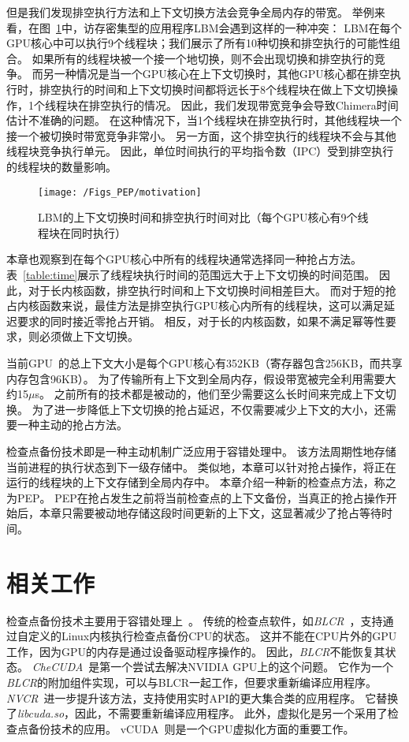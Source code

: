 但是我们发现排空执行方法和上下文切换方法会竞争全局内存的带宽。
举例来看，在图~\ref{fig:motivation}中，访存密集型的应用程序LBM会遇到这样的一种冲突：
LBM在每个GPU核心中可以执行9个线程块；我们展示了所有10种切换和排空执行的可能性组合。
如果所有的线程块被一个接一个地切换，则不会出现切换和排空执行的竞争。
而另一种情况是当一个GPU核心在上下文切换时，其他GPU核心都在排空执行时，排空执行的时间和上下文切换时间都将远长于8个线程块在做上下文切换操作，1个线程块在排空执行的情况。
因此，我们发现带宽竞争会导致Chimera时间估计不准确的问题。
在这种情况下，当1个线程块在排空执行时，其他线程块一个接一个被切换时带宽竞争非常小。
另一方面，这个排空执行的线程块不会与其他线程块竞争执行单元。
因此，单位时间执行的平均指令数（IPC）受到排空执行的线程块的数量影响。


\begin{figure}[htbp] %
  \centering
  \texttt{[image: /Figs\_PEP/motivation]}
  \caption{LBM的上下文切换时间和排空执行时间对比（每个GPU核心有9个线程块在同时执行）}
  \label{fig:motivation}
\end{figure}


本章也观察到在每个GPU核心中所有的线程块通常选择同一种抢占方法。
表~\ref{table:time}展示了线程块执行时间的范围远大于上下文切换的时间范围。
因此，对于长内核函数，排空执行时间和上下文切换时间相差巨大。
而对于短的抢占内核函数来说，最佳方法是排空执行GPU核心内所有的线程块，这可以满足延迟要求的同时接近零抢占开销。
相反，对于长的内核函数，如果不满足幂等性要求，则必须做上下文切换。

当前GPU~的总上下文大小是每个GPU核心有352KB（寄存器包含256KB，而共享内存包含96KB）。
为了传输所有上下文到全局内存，假设带宽被完全利用需要大约15$\mu$s。
之前所有的技术都是被动的，他们至少需要这么长时间来完成上下文切换。
为了进一步降低上下文切换的抢占延迟，不仅需要减少上下文的大小，还需要一种主动的抢占方法。

检查点备份技术即是一种主动机制广泛应用于容错处理中。
该方法周期性地存储当前进程的执行状态到下一级存储中。
类似地，本章可以针对抢占操作，将正在运行的线程块的上下文存储到全局内存中。
本章介绍一种新的检查点方法，称之为PEP。
PEP在抢占发生之前将当前检查点的上下文备份，当真正的抢占操作开始后，本章只需要被动地存储这段时间更新的上下文，这显著减少了抢占等待时间。

\section{相关工作}
\label{sec:peprelated}

检查点备份技术主要用于容错处理上~。
传统的检查点软件，如\emph{BLCR}~，支持通过自定义的Linux内核执行检查点备份CPU的状态。
这并不能在CPU片外的GPU工作，因为GPU的内存是通过设备驱动程序操作的。
因此，\emph{BLCR}不能恢复其状态。
\emph{CheCUDA}~是第一个尝试去解决NVIDIA GPU上的这个问题。
它作为一个\emph{BLCR}的附加组件实现，可以与BLCR一起工作，但要求重新编译应用程序。
\emph{NVCR}~进一步提升该方法，支持使用实时API的更大集合类的应用程序。
它替换了\emph{libcuda.so}，因此，不需要重新编译应用程序。
此外，虚拟化是另一个采用了检查点备份技术的应用。
vCUDA~则是一个GPU虚拟化方面的重要工作。



